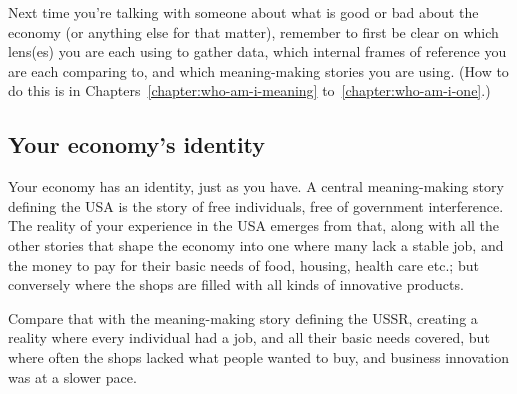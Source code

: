 Next time you're talking with someone about what is good or bad about the economy (or anything else for that matter), remember to first be clear on which lens(es) you are each using to gather data, which internal frames of reference you are each comparing to, and which meaning\hyp{}making stories you are using. (How to do this is in Chapters~\ref{chapter:who-am-i-meaning} to~\ref{chapter:who-am-i-one}.)


\subsection{Your economy's identity}
Your economy has an identity, just as you have. A central meaning\hyp{}making story defining the USA is the story of free individuals, free of government interference. The reality of your experience in the USA emerges from that, along with all the other stories that shape the economy into one where many lack a stable job, and the money to pay for their basic needs of food, housing, health care etc.; but conversely where the shops are filled with all kinds of innovative products. 


Compare that with the meaning\hyp{}making story defining the USSR, creating a reality where every individual had a job, and all their basic needs covered, but where often the shops lacked what people wanted to buy, and business innovation was at a slower pace.



